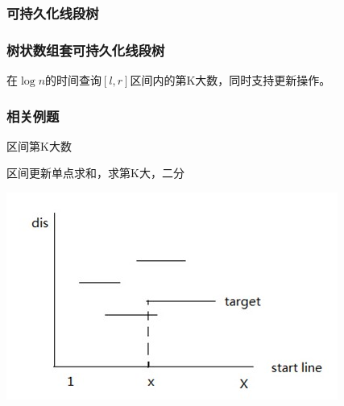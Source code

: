 \subsubsection{可持久化线段树}


\subsubsection{树状数组套可持久化线段树}
在$\log n$的时间查询$[l, r]$区间内的第K大数，同时支持更新操作。

\subsubsection{相关例题}
区间第K大数

区间更新单点求和，求第K大，二分 \\
\begin{center}
\includegraphics[scale=1]{./模板/4_数据结构/9_可持久化线段树/4_HDU4866.jpg}
\end{center}
